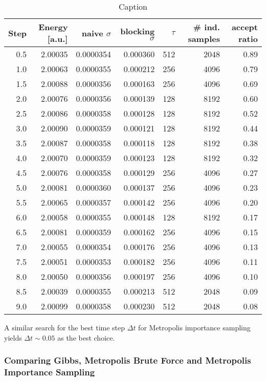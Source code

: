 \documentclass[twoside,english]{uiofysmaster}
\newcommand{\ra}[1]{\renewcommand{\arraystretch}{#1}}
\begin{document}
\begin{table*}\centering
\ra{1.3}
\caption{Caption}
\label{tab:BFdetailed}
\begin{tabular}{rrrrrrr}
\toprule
\toprule
Step & Energy [a.u.] & naive $\sigma$ & blocking $\sigma$ & $\tau$ & \# ind. samples & accept ratio \\ 
\midrule 
0.5 & 2.00035 & 0.0000354 & 0.000360 & 512 & 2048 & 0.89 \\
1.0 & 2.00063 & 0.0000355 & 0.000212 & 256 & 4096 & 0.79 \\
1.5 & 2.00088 & 0.0000356 & 0.000163 & 256 & 4096 & 0.69 \\
2.0 & 2.00076 & 0.0000356 & 0.000139 & 128 & 8192 & 0.60 \\
2.5 & 2.00086 & 0.0000358 & 0.000128 & 128 & 8192 & 0.52 \\
3.0 & 2.00090 & 0.0000359 & 0.000121 & 128 & 8192 & 0.44 \\
3.5 & 2.00087 & 0.0000358 & 0.000118 & 128 & 8192 & 0.38 \\
4.0 & 2.00070 & 0.0000359 & 0.000123 & 128 & 8192 & 0.32 \\
4.5 & 2.00076 & 0.0000358 & 0.000129 & 256 & 4096 & 0.27 \\
5.0 & 2.00081 & 0.0000360 & 0.000137 & 256 & 4096 & 0.23 \\
5.5 & 2.00065 & 0.0000357 & 0.000142 & 256 & 4096 & 0.20 \\
6.0 & 2.00058 & 0.0000355 & 0.000148 & 128 & 8192 & 0.17 \\
6.5 & 2.00081 & 0.0000359 & 0.000162 & 256 & 4096 & 0.15 \\
7.0 & 2.00055 & 0.0000354 & 0.000176 & 256 & 4096 & 0.13 \\
7.5 & 2.00051 & 0.0000353 & 0.000182 & 256 & 4096 & 0.11 \\
8.0 & 2.00050 & 0.0000356 & 0.000197 & 256 & 4096 & 0.10 \\
8.5 & 2.00039 & 0.0000355 & 0.000213 & 512 & 2048 & 0.09 \\
9.0 & 2.00099 & 0.0000358 & 0.000230 & 512 & 2048 & 0.08 \\
\bottomrule
\bottomrule
\end{tabular}
\end{table*}

A similar search for the best time step $\Delta t$ for Metropolis importance sampling yields $\Delta t \sim 0.05 $ as the best choice.

\subsubsection{Comparing Gibbs, Metropolis Brute Force and Metropolis Importance Sampling}
\end{document}
